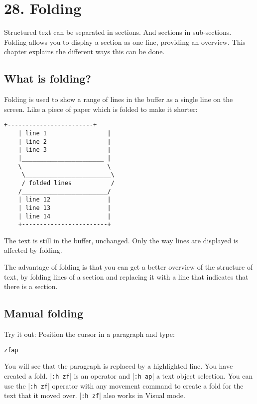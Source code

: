 \section{28. Folding}
Structured text can be separated in sections.  And sections in sub-sections.
Folding allows you to display a section as one line, providing an overview.
This chapter explains the different ways this can be done.
\localtableofcontents
\subsection{What is folding?}
Folding is used to show a range of lines in the buffer as a single line on the screen.
Like a piece of paper which is folded to make it shorter:

\begin{Verbatim}[samepage=true]
    +------------------------+
    | line 1                 |
    | line 2                 |
    | line 3                 |
    |_______________________ |
    \                        \
     \________________________\
     / folded lines           /
    /________________________/
    | line 12                |
    | line 13                |
    | line 14                |
    +------------------------+
\end{Verbatim}

The text is still in the buffer, unchanged.
Only the way lines are displayed is affected by folding.

The advantage of folding is that you can get a better overview of the structure of text, by folding lines of a section and replacing it with a line that indicates that there is a section.
\subsection{Manual folding}
Try it out: Position the cursor in a paragraph and type:

\begin{Verbatim}[samepage=true]
 zfap
\end{Verbatim}

You will see that the paragraph is replaced by a highlighted line.
You have created a fold.
|\texttt{:h zf}| is an operator and |\texttt{:h ap}| a text object selection.
You can use the |\texttt{:h zf}| operator with any movement command to create a fold for the text that it moved over.
|\texttt{:h zf}| also works in Visual mode.

